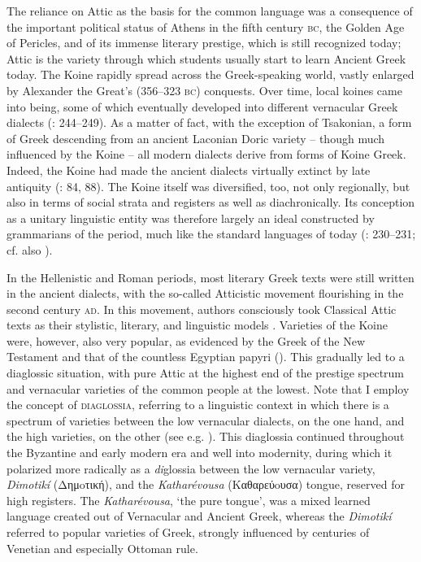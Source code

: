 The reliance on Attic as the basis for the common language was a consequence of the important political status of Athens in the fifth century \textsc{bc}, the Golden Age of Pericles, and of its immense literary prestige, which is still recognized today; Attic is the variety through which students usually start to learn Ancient Greek today. The Koine rapidly spread across the Greek-speaking world, vastly enlarged by Alexander the Great’s (356–323 \textsc{bc}) conquests. Over time, local koines came into being, some of which eventually developed into different vernacular Greek dialects (\citealt{Brixhe2010}: 244–249). As a matter of fact, with the exception of Tsakonian, a form of Greek descending from an ancient Laconian Doric variety – though much influenced by the Koine \citep[88]{Horrocks2010} – all modern dialects derive from forms of Koine Greek. Indeed, the Koine had made the ancient dialects virtually extinct by late antiquity (\citealt{Horrocks2010}: 84, 88). The Koine itself was diversified, too, not only regionally, but also in terms of social strata and registers as well as diachronically. Its conception as a unitary linguistic entity was therefore largely an ideal constructed by grammarians of the period, much like the standard languages of today (\citealt{Brixhe2010}: 230–231; cf. also \citealt{VanRooy2016b}).

In the Hellenistic and Roman periods, most literary Greek texts were still written in the ancient dialects, with the so-called Atticistic movement flourishing in the second century \textsc{ad}. In this movement, authors consciously took Classical Attic texts as their stylistic, literary, and linguistic models \citep[42]{Whitmarsh2005}. Varieties of the Koine were, however, also very popular, as evidenced by the Greek of the New Testament and that of the countless Egyptian papyri (\citealt{Evans2010}). This gradually led to a diaglossic situation, with pure Attic at the highest end of the prestige spectrum and vernacular varieties of the common people at the lowest. Note that I employ the concept of \textsc{diaglossia}, referring to a linguistic context in which there is a spectrum of varieties between the low vernacular dialects, on the one hand, and the high varieties, on the other (see e.g. \citealt{Auer2005,Rutten2016}). This diaglossia continued throughout the Byzantine and early modern era and well into modernity, during which it polarized more radically as a \textit{di}glossia between the low vernacular variety, \textit{Dimotikí} (Δημoτική), and the \textit{Katharévousa} (Kαθαρεύoυσα) tongue, reserved for high registers. The \textit{Katharévousa}, ‘the pure tongue’, was a mixed learned language created out of Vernacular and Ancient Greek, whereas the \textit{Dimotikí} referred to popular varieties of Greek, strongly influenced by centuries of Venetian and especially Ottoman rule.

